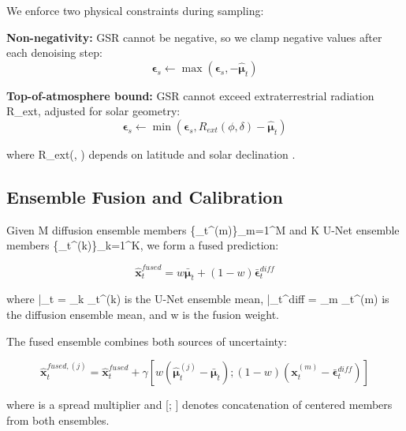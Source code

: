 \documentclass[preprint,12pt]{elsarticle}
\begin{document}
We enforce two physical constraints during sampling:

\textbf{Non-negativity:} GSR cannot be negative, so we clamp negative values after each denoising step:
\begin{equation}
\boldsymbol{\epsilon}_s \leftarrow \max(\boldsymbol{\epsilon}_s, -\hat{\boldsymbol{\mu}}_t)
\label{eq:nonneg}
\end{equation}

\textbf{Top-of-atmosphere bound:} GSR cannot exceed extraterrestrial radiation R_{ext}, adjusted for solar geometry:
\begin{equation}
\boldsymbol{\epsilon}_s \leftarrow \min(\boldsymbol{\epsilon}_s, R_{ext}(\phi, \delta) - \hat{\boldsymbol{\mu}}_t)
\label{eq:toabound}
\end{equation}

where R_{ext}(\phi, \delta) depends on latitude \phi and solar declination \delta.

\subsection{Ensemble Fusion and Calibration}
\label{sec:fusion}

Given M diffusion ensemble members \{_t^{(m)}\}_{m=1}^M and K U-Net ensemble members \{\hat{\boldsymbol{\mu}}_t^{(k)}\}_{k=1}^K, we form a fused prediction:

\begin{equation}
\hat{\mathbf{x}}_t^{fused} = w \bar{\boldsymbol{\mu}}_t + (1-w) \bar{\boldsymbol{\epsilon}}_t^{diff}
\label{eq:fusion_mean}
\end{equation}

where \bar{\boldsymbol{\mu}}_t = \sum_k \hat{\boldsymbol{\mu}}_t^{(k)} is the U-Net ensemble mean, \bar{\boldsymbol{\epsilon}}_t^{diff} = \sum_m _t^{(m)} is the diffusion ensemble mean, and w \in [0,1] is the fusion weight.

The fused ensemble combines both sources of uncertainty:

\begin{equation}
\hat{\mathbf{x}}_t^{fused,(j)} = \hat{\mathbf{x}}_t^{fused} + \gamma \left[ w(\hat{\boldsymbol{\mu}}_t^{(j)} - \bar{\boldsymbol{\mu}}_t); (1-w)(\mathbf{x}_t^{(m)} - \bar{\boldsymbol{\epsilon}}_t^{diff}) \right]
\label{eq:fusion_ensemble}
\end{equation}

where \gamma is a spread multiplier and [\cdot; \cdot] denotes concatenation of centered members from both ensembles.
\end{document}
